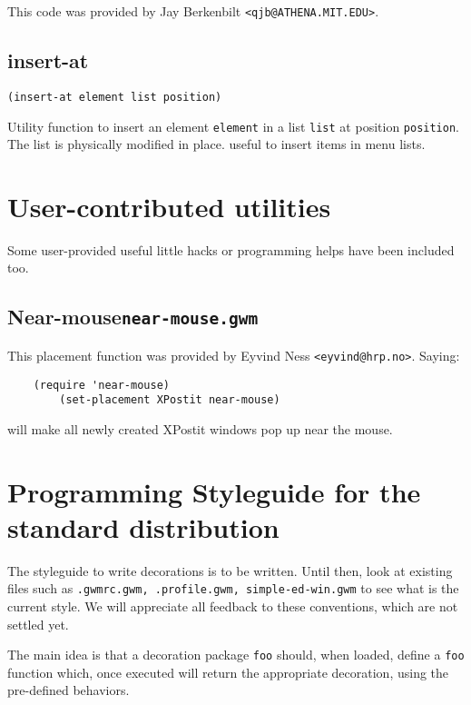 This code was provided by Jay Berkenbilt \verb|<qjb@ATHENA.MIT.EDU>|.

\subsection{insert-at}
\label{insert-at}

{\usagefont\begin{verbatim}
(insert-at element list position)
\end{verbatim}}\usageupspace

Utility function to insert an element \verb"element" in a list \verb"list" at
position \verb"position". The  list is physically modified in place. useful to
insert items in menu lists.

\section{User-contributed utilities}
\label{user-contrib-utils}

Some user-provided useful little hacks or programming helps have been
included too.

\subsection{Near-mouse\hfill{\tt near-mouse.gwm}}
\label{near-mouse.gwm}

This placement function was provided by Eyvind Ness \verb|<eyvind@hrp.no>|.
Saying:
{\exemplefont\begin{verbatim}
	(require 'near-mouse)
        (set-placement XPostit near-mouse)
\end{verbatim}}
will make all newly created XPostit windows pop up near the mouse.

\section{Programming Styleguide for the standard distribution}
\label{standard-styleguide}

The styleguide to write decorations is to be written. Until then, look at
existing files such as {\tt .gwmrc.gwm, .profile.gwm, simple-ed-win.gwm} to
see what is the current style. We will appreciate all feedback to these
conventions, which are not settled yet.

The main idea is that a decoration package \verb"foo" should, when loaded,
define a \verb"foo" function which, once executed will return the appropriate
decoration, using the pre-defined behaviors.

